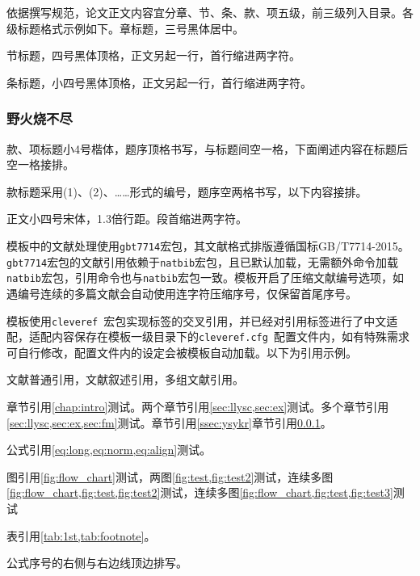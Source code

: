 \label{sec:fm}
依据撰写规范，论文正文内容宜分章、节、条、款、项五级，前三级列入目录。各级标题格式示例如下。章标题，三号黑体居中。

\label{sec:llysc}
节标题，四号黑体顶格，正文另起一行，首行缩进两字符。

\label{ssec:ysykr}
条标题，小四号黑体顶格，正文另起一行，首行缩进两字符。
\subsubsection{野火烧不尽}\label{sssec:yhsbj}
款、项标题小4号楷体，题序顶格书写，与标题间空一格，下面阐述内容在标题后空一格接排。

款标题采用(1)、(2)、……形式的编号，题序空两格书写，以下内容接排。

正文小四号宋体，1.3倍行距。段首缩进两字符。

\label{sec:ex}
模板中的文献处理使用\verb|gbt7714|宏包，其文献格式排版遵循国标GB/T7714-2015。\verb|gbt7714|宏包的文献引用依赖于\verb|natbib|宏包，且已默认加载，无需额外命令加载\verb|natbib|宏包，引用命令也与\verb|natbib|宏包一致。模板开启了压缩文献编号选项，如遇编号连续的多篇文献会自动使用连字符压缩序号，仅保留首尾序号。

模板使用\verb|cleveref|~宏包实现标签的交叉引用，并已经对引用标签进行了中文适配，适配内容保存在模板一级目录下的\verb|cleveref.cfg|~配置文件内，如有特殊需求可自行修改，配置文件内的设定会被模板自动加载。以下为引用示例。

文献普通引用\cite{同鸣2012}，文献叙述引用\citet{Boutsidis2011}，多组文献引用\cite{同鸣2012, Lee1999, Tang2013, Ding2006Orthogonal}。

章节引用\cref{chap:intro}测试。两个章节引用\cref{sec:llysc,sec:ex}测试。多个章节引用\cref{sec:llysc,sec:ex,sec:fm}测试。章节引用\cref{ssec:ysykr}章节引用\cref{sssec:yhsbj}。

公式引用\cref{eq:long,eq:norm,eq:align}测试。

图引用\cref{fig:flow_chart}测试，两图\cref{fig:test,fig:test2}测试，连续多图\cref{fig:flow_chart,fig:test,fig:test2}测试，连续多图\cref{fig:flow_chart,fig:test,fig:test3}测试

表引用\cref{tab:1st,tab:footnote}。

公式序号的右侧与右边线顶边排写。

